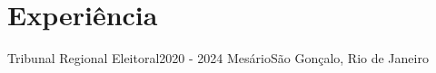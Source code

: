 \section{Experiência}
\resumeSubHeadingListStart

    
    \resumeSubheading
    {Tribunal Regional Eleitoral}{2020 - 2024}
    {Mesário}{São Gonçalo, Rio de Janeiro}
    \resumeItemListStart
        
    \resumeItemListEnd
    
     

\resumeSubHeadingListEnd